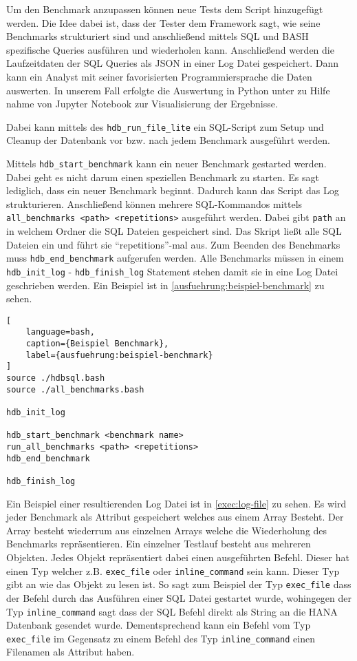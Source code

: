 Um den Benchmark anzupassen können neue Tests dem Script hinzugefügt werden.
Die Idee dabei ist, dass der Tester dem Framework sagt, wie seine
Benchmarks strukturiert sind und anschließend mittels SQL\cite{sql} und BASH
spezifische Queries ausführen und wiederholen kann.
Anschließend werden die Laufzeitdaten der SQL Queries als JSON\cite{json} in einer
Log Datei gespeichert.
Dann kann ein Analyst mit seiner favorisierten Programmiersprache
die Daten auswerten. In unserem Fall erfolgte die Auswertung in Python unter zu Hilfe nahme von Jupyter Notebook zur Visualisierung der Ergebnisse.

Dabei kann mittels des \verb+hdb_run_file_lite+ ein SQL-Script
zum Setup und Cleanup der Datenbank vor bzw. nach jedem Benchmark ausgeführt werden.

Mittels \verb+hdb_start_benchmark+ kann ein neuer Benchmark gestarted werden.
Dabei geht es nicht darum einen speziellen Benchmark zu starten.
Es sagt lediglich, dass ein neuer Benchmark beginnt. Dadurch kann das Script
das Log strukturieren.
Anschließend können mehrere SQL-Kommandos mittels \verb+all_benchmarks <path> <repetitions>+ ausgeführt werden.
Dabei gibt \verb+path+ an in welchem Ordner die SQL Dateien gespeichert sind.
Das Skript ließt alle SQL Dateien ein und führt sie \enquote{repetitions}-mal aus.
Zum Beenden des Benchmarks muss \verb+hdb_end_benchmark+ aufgerufen werden.
Alle Benchmarks müssen in einem \verb+hdb_init_log+ - \verb+hdb_finish_log+ Statement 
stehen damit sie in eine Log Datei geschrieben werden.
Ein Beispiel ist in \autoref{ausfuehrung:beispiel-benchmark} zu sehen.

\begin{lstlisting}[
	language=bash,
	caption={Beispiel Benchmark},
	label={ausfuehrung:beispiel-benchmark}
]
source ./hdbsql.bash
source ./all_benchmarks.bash

hdb_init_log

hdb_start_benchmark <benchmark name>
run_all_benchmarks <path> <repetitions>
hdb_end_benchmark

hdb_finish_log
\end{lstlisting}

Ein Beispiel einer resultierenden Log Datei ist in \autoref{exec:log-file} zu sehen.
Es wird jeder Benchmark als Attribut gespeichert welches aus einem Array Besteht.
Der Array besteht wiederrum aus einzelnen Arrays welche die Wiederholung des Benchmarks repräsentieren.
Ein einzelner Testlauf besteht aus mehreren Objekten. Jedes Objekt repräsentiert dabei
einen ausgeführten Befehl. Dieser hat einen Typ welcher z.B. \verb+exec_file+ oder 
\verb+inline_command+ sein kann.
Dieser Typ gibt an wie das Objekt zu lesen ist. So sagt zum Beispiel der Typ \verb+exec_file+
dass der Befehl durch das Ausführen einer SQL Datei gestartet wurde, wohingegen
der Typ \verb+inline_command+ sagt dass der SQL Befehl direkt als String
an die HANA Datenbank gesendet wurde. Dementsprechend kann ein Befehl vom Typ \verb+exec_file+
im Gegensatz zu einem Befehl des Typ \verb+inline_command+ einen Filenamen als Attribut haben.

